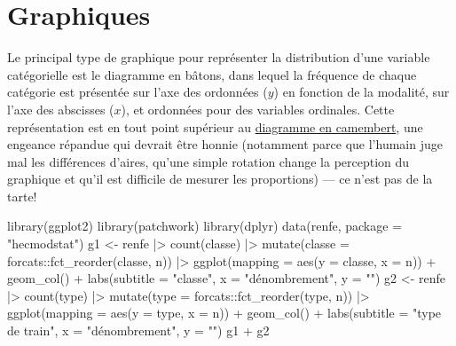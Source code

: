 \documentclass[
  11pt,
  letterpaper,
]{book}
\newenvironment{Shaded}{\begin{snugshade}}{\end{snugshade}}
\newcommand{\AttributeTok}[1]{\textcolor[rgb]{0.40,0.45,0.13}{#1}}
\newcommand{\FunctionTok}[1]{\textcolor[rgb]{0.28,0.35,0.67}{#1}}
\newcommand{\NormalTok}[1]{\textcolor[rgb]{0.00,0.23,0.31}{#1}}
\newcommand{\OtherTok}[1]{\textcolor[rgb]{0.00,0.23,0.31}{#1}}
\newcommand{\SpecialCharTok}[1]{\textcolor[rgb]{0.37,0.37,0.37}{#1}}
\newcommand{\StringTok}[1]{\textcolor[rgb]{0.13,0.47,0.30}{#1}}
\theoremstyle{definition}
\theoremstyle{remark}
\begin{document}
\hypertarget{graphiques}{%
\section{Graphiques}\label{graphiques}}

Le principal type de graphique pour représenter la distribution d'une
variable catégorielle est le diagramme en bâtons, dans lequel la
fréquence de chaque catégorie est présentée sur l'axe des ordonnées
(\(y\)) en fonction de la modalité, sur l'axe des abscisses (\(x\)), et
ordonnées pour des variables ordinales. Cette représentation est en tout
point supérieur au
\href{http://www.perceptualedge.com/articles/08-21-07.pdf}{diagramme en
camembert}, une engeance répandue qui devrait être honnie (notamment
parce que l'humain juge mal les différences d'aires, qu'une simple
rotation change la perception du graphique et qu'il est difficile de
mesurer les proportions) --- ce n'est pas de la tarte!

\begin{Shaded}
\begin{Highlighting}[]
\FunctionTok{library}\NormalTok{(ggplot2)}
\FunctionTok{library}\NormalTok{(patchwork)}
\FunctionTok{library}\NormalTok{(dplyr)}
\FunctionTok{data}\NormalTok{(renfe, }\AttributeTok{package =} \StringTok{"hecmodstat"}\NormalTok{)}
\NormalTok{g1 }\OtherTok{\textless{}{-}}\NormalTok{ renfe }\SpecialCharTok{|\textgreater{}}
    \FunctionTok{count}\NormalTok{(classe) }\SpecialCharTok{|\textgreater{}}
    \FunctionTok{mutate}\NormalTok{(}\AttributeTok{classe =}\NormalTok{ forcats}\SpecialCharTok{::}\FunctionTok{fct\_reorder}\NormalTok{(classe, n))  }\SpecialCharTok{|\textgreater{}}
\FunctionTok{ggplot}\NormalTok{(}\AttributeTok{mapping =} \FunctionTok{aes}\NormalTok{(}\AttributeTok{y =}\NormalTok{ classe, }\AttributeTok{x =}\NormalTok{ n)) }\SpecialCharTok{+} 
    \FunctionTok{geom\_col}\NormalTok{() }\SpecialCharTok{+} 
    \FunctionTok{labs}\NormalTok{(}\AttributeTok{subtitle =} \StringTok{"classe"}\NormalTok{, }
    \AttributeTok{x =} \StringTok{"dénombrement"}\NormalTok{, }
    \AttributeTok{y =} \StringTok{""}\NormalTok{)}
\NormalTok{g2 }\OtherTok{\textless{}{-}}\NormalTok{ renfe }\SpecialCharTok{|\textgreater{}}
    \FunctionTok{count}\NormalTok{(type) }\SpecialCharTok{|\textgreater{}}
    \FunctionTok{mutate}\NormalTok{(}\AttributeTok{type =}\NormalTok{ forcats}\SpecialCharTok{::}\FunctionTok{fct\_reorder}\NormalTok{(type, n))  }\SpecialCharTok{|\textgreater{}}
\FunctionTok{ggplot}\NormalTok{(}\AttributeTok{mapping =} \FunctionTok{aes}\NormalTok{(}\AttributeTok{y =}\NormalTok{ type, }\AttributeTok{x =}\NormalTok{ n)) }\SpecialCharTok{+} 
    \FunctionTok{geom\_col}\NormalTok{() }\SpecialCharTok{+} 
    \FunctionTok{labs}\NormalTok{(}\AttributeTok{subtitle =} \StringTok{"type de train"}\NormalTok{, }
         \AttributeTok{x =} \StringTok{"dénombrement"}\NormalTok{, }
         \AttributeTok{y =} \StringTok{""}\NormalTok{)}
\NormalTok{g1 }\SpecialCharTok{+}\NormalTok{ g2}
\end{Highlighting}
\end{Shaded}
\end{document}
